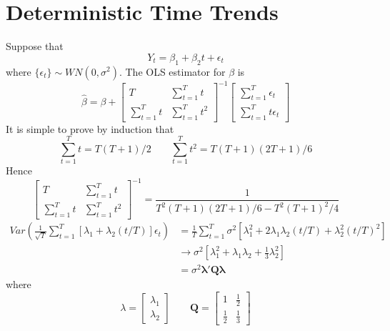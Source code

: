 \documentclass[11pt]{article}
\begin{document}
\section{Deterministic Time Trends}
Suppose that
\begin{equation}
Y_t = \beta_1 + \beta_2 t + \epsilon_t
\end{equation}
where $\{ \epsilon_t \} \sim WN \left( 0 , \sigma^2 \right)$.
The OLS estimator for $\beta$ is
\begin{equation}
\widehat{\beta} = \beta +
\left[
\begin{matrix}
T & \sum_{t=1}^T t \\
\sum_{t=1}^T t & \sum_{t=1}^T t^2
\end{matrix}
\right]^{-1}
\left[
\begin{matrix}
\sum_{t=1}^T \epsilon_t \\
\sum_{t=1}^T t \epsilon_t
\end{matrix}
\right]
\end{equation}
It is simple to prove by induction that
\begin{equation}
\sum_{t=1}^T t = T \left( T+1 \right) / 2
\;\;\;\;\;\;\;
\sum_{t=1}^T t^2 = T \left( T+1 \right) \left( 2T + 1 \right)/6
\end{equation}
Hence
\begin{equation}
\left[
\begin{matrix}
T & \sum_{t=1}^T t \\
\sum_{t=1}^T t & \sum_{t=1}^T t^2
\end{matrix}
\right]^{-1}
= \frac{1}{T^2 \left( T+1 \right)\left(2T+1 \right)/6 - T^2 \left(T+1\right)^2/4}
\end{equation}
\begin{equation}
\begin{split}
Var \left( \frac{1}{\sqrt{T}} \sum_{t=1}^T \left[ \lambda_1 + \lambda_2 \left( t / T \right) \right] \epsilon_t \right)
& = \frac{1}{T} \sum_{t=1}^T \sigma^2 \left[ \lambda_1^2 + 2 \lambda_1 \lambda_2 \left( t/T \right) + \lambda_2^2 \left( t/T \right)^2 \right] \\
& \rightarrow \sigma^2 \left[ \lambda_1^2 + \lambda_1 \lambda_2 + \frac{1}{3} \lambda_2^2 \right] \\
& = \sigma^2 \mathbf{\lambda}' \mathbf{Q \lambda}
\end{split}
\end{equation}
where 
\begin{equation}
\lambda = \left[ \begin{matrix}
\lambda_1 \\ \lambda_2
\end{matrix} \right]
\;\;\;\;\;\;\;
\mathbf{Q} = \left[ \begin{matrix}
1 & \frac{1}{2} \\
\frac{1}{2} & \frac{1}{3}
\end{matrix} \right]
\end{equation}
\end{document}
